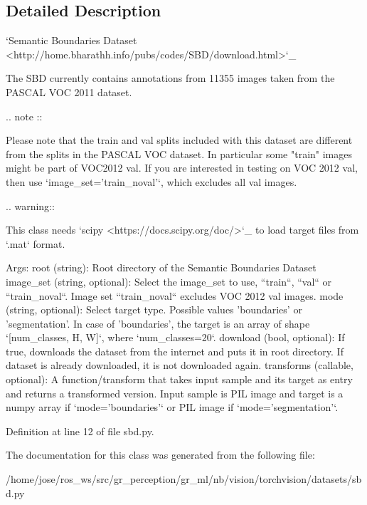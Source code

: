 \subsection{Detailed Description}
\begin{DoxyVerb}`Semantic Boundaries Dataset <http://home.bharathh.info/pubs/codes/SBD/download.html>`_

The SBD currently contains annotations from 11355 images taken from the PASCAL VOC 2011 dataset.

.. note ::

    Please note that the train and val splits included with this dataset are different from
    the splits in the PASCAL VOC dataset. In particular some "train" images might be part of
    VOC2012 val.
    If you are interested in testing on VOC 2012 val, then use `image_set='train_noval'`,
    which excludes all val images.

.. warning::

    This class needs `scipy <https://docs.scipy.org/doc/>`_ to load target files from `.mat` format.

Args:
    root (string): Root directory of the Semantic Boundaries Dataset
    image_set (string, optional): Select the image_set to use, ``train``, ``val`` or ``train_noval``.
        Image set ``train_noval`` excludes VOC 2012 val images.
    mode (string, optional): Select target type. Possible values 'boundaries' or 'segmentation'.
        In case of 'boundaries', the target is an array of shape `[num_classes, H, W]`,
        where `num_classes=20`.
    download (bool, optional): If true, downloads the dataset from the internet and
        puts it in root directory. If dataset is already downloaded, it is not
        downloaded again.
    transforms (callable, optional): A function/transform that takes input sample and its target as entry
        and returns a transformed version. Input sample is PIL image and target is a numpy array
        if `mode='boundaries'` or PIL image if `mode='segmentation'`.
\end{DoxyVerb}
 

Definition at line 12 of file sbd.\+py.



The documentation for this class was generated from the following file\+:\begin{DoxyCompactItemize}
\item 
/home/jose/ros\+\_\+ws/src/gr\+\_\+perception/gr\+\_\+ml/nb/vision/torchvision/datasets/sbd.\+py\end{DoxyCompactItemize}

